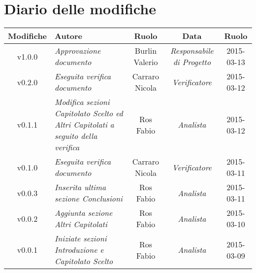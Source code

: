 \newpage
\section*{Diario delle modifiche}

\begin{table}[h]
\centering
\begin{tabular}{|c|p{}|c|c|c|}
	\toprule
		\textbf{Modifiche} & \textbf{Autore} & \textbf{Ruolo} & \textbf{Data} & \textbf{Ruolo} \\
	\midrule
	\midrule
		v1.0.0 & \textit{Approvazione documento} & Burlin Valerio & \textit{Responsabile di Progetto} & 2015-03-13\\
	\midrule
		v0.2.0 & \textit{Eseguita verifica documento} & Carraro Nicola & \textit{Verificatore} & 2015-03-12\\
	\midrule
		v0.1.1 & \textit{Modifica sezioni Capitolato Scelto ed Altri Capitolati a seguito della verifica} & Ros Fabio & \textit{Analista} & 2015-03-12\\
	\midrule
		v0.1.0 & \textit{Eseguita verifica documento} & Carraro Nicola & \textit{Verificatore} & 2015-03-11\\
	\midrule
		v0.0.3 & \textit{Inserita ultima sezione Conclusioni} & Ros Fabio & \textit{Analista} & 2015-03-11\\
	\midrule
		v0.0.2 & \textit{Aggiunta sezione Altri Capitolati} & Ros Fabio & \textit{Analista} & 2015-03-10\\
	\midrule
		v0.0.1 & \textit{Iniziate sezioni Introduzione e Capitolato Scelto} & Ros Fabio & \textit{Analista} & 2015-03-09\\
	\bottomrule
\end{tabular}
\end{table}

\newpage
